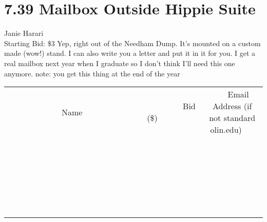 \documentclass[11pt]{article}
\begin{document}
\section*{7.39 Mailbox Outside Hippie Suite}
Janie Harari
\\
Starting Bid: \$3
\newline
Yep, right out of the Needham Dump.  It's mounted on a custom made (wow!) stand.  I can also write you a letter and put it in it for you.  I get a real mailbox next year when I graduate so I don't think I'll need this one anymore. note: you get this thing at the end of the year
\\[6ex]
\begin{tabular}{c c c}
~~~~~~~~~~~~~Name~~~~~~~~~~~~~ & ~~~~~~~~~Bid (\$)~~~~~~~~~  & ~~~Email Address (if not standard olin.edu)~~~\\
 & & \\
\hline
 & & \\
\hline
 & & \\
\hline
 & & \\
\hline
 & & \\
\hline
 & & \\
\hline
 & & \\
\hline
 & & \\
\hline
 & & \\
\hline
 & & \\
\hline
 & & \\
\hline
 & & \\
\hline
 & & \\
\hline
 & & \\
\hline
 & & \\
\hline
 & & \\
\hline
 & & \\
\hline
 & & \\
\hline
 & & \\
\hline
 & & \\
\hline
 & & \\
\hline
 & & \\
\hline
 & & \\
\hline
 & & \\
\hline
 & & \\
\hline
 & & \\
\hline
\end{tabular}
\newpage
\end{document}
